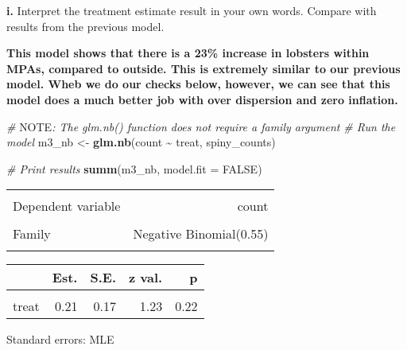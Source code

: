\documentclass[
]{article}
\newenvironment{Shaded}{\begin{snugshade}}{\end{snugshade}}
\newcommand{\AlertTok}[1]{\textcolor[rgb]{0.94,0.16,0.16}{#1}}
\newcommand{\AttributeTok}[1]{\textcolor[rgb]{0.13,0.29,0.53}{#1}}
\newcommand{\CommentTok}[1]{\textcolor[rgb]{0.56,0.35,0.01}{\textit{#1}}}
\newcommand{\ConstantTok}[1]{\textcolor[rgb]{0.56,0.35,0.01}{#1}}
\newcommand{\FunctionTok}[1]{\textcolor[rgb]{0.13,0.29,0.53}{\textbf{#1}}}
\newcommand{\NormalTok}[1]{#1}
\newcommand{\OtherTok}[1]{\textcolor[rgb]{0.56,0.35,0.01}{#1}}
\newcommand{\SpecialCharTok}[1]{\textcolor[rgb]{0.81,0.36,0.00}{\textbf{#1}}}
\begin{document}
\textbf{i.} Interpret the treatment estimate result in your own words.
Compare with results from the previous model.

\textbf{This model shows that there is a 23\% increase in lobsters
within MPAs, compared to outside. This is extremely similar to our
previous model. Wheb we do our checks below, however, we can see that
this model does a much better job with over dispersion and zero
inflation.}

\begin{Shaded}
\begin{Highlighting}[]
\CommentTok{\# }\AlertTok{NOTE}\CommentTok{: The \textasciigrave{}glm.nb()\textasciigrave{} function does not require a \textasciigrave{}family\textasciigrave{} argument}
\CommentTok{\# Run the model}
\NormalTok{m3\_nb }\OtherTok{\textless{}{-}} \FunctionTok{glm.nb}\NormalTok{(count }\SpecialCharTok{\textasciitilde{}}\NormalTok{ treat, spiny\_counts)}

\CommentTok{\# Print results}
\FunctionTok{summ}\NormalTok{(m3\_nb, }\AttributeTok{model.fit =} \ConstantTok{FALSE}\NormalTok{)}
\end{Highlighting}
\end{Shaded}

\begin{table}[!h]
\centering
\begin{tabular}{lr}
\toprule
\cellcolor{gray!10}{Observations} & \cellcolor{gray!10}{252}\\
Dependent variable & count\\
\cellcolor{gray!10}{Type} & \cellcolor{gray!10}{Generalized linear model}\\
Family & Negative Binomial(0.55)\\
\cellcolor{gray!10}{Link} & \cellcolor{gray!10}{log}\\
\bottomrule
\end{tabular}
\end{table}  \begin{table}[!h]
\centering
\begin{threeparttable}
\begin{tabular}{lrrrr}
\toprule
  & Est. & S.E. & z val. & p\\
\midrule
\cellcolor{gray!10}{(Intercept)} & \cellcolor{gray!10}{3.12} & \cellcolor{gray!10}{0.12} & \cellcolor{gray!10}{26.40} & \cellcolor{gray!10}{0.00}\\
treat & 0.21 & 0.17 & 1.23 & 0.22\\
\bottomrule
\end{tabular}
\begin{tablenotes}
\item Standard errors: MLE
\end{tablenotes}
\end{threeparttable}
\end{table}
\end{document}
